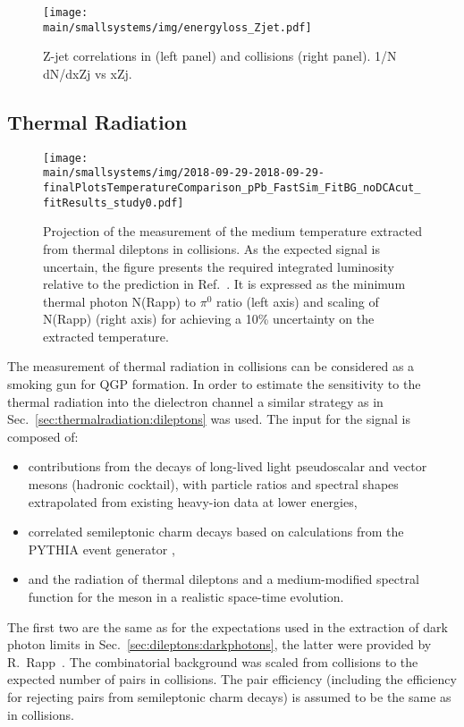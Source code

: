 \documentclass[../report.tex]{subfiles}
\providecommand{\main}{..}
\begin{document}
\begin{figure}[ht]
\centering
\texttt{[image: \\main/smallsystems/img/energyloss\_Zjet.pdf]}

\caption{Z-jet correlations in \pp (left panel) and \pPb collisions (right panel). 1/N dN/dxZj vs xZj.}
\label{fig:smallsystems_energyloss_Zjet}
\end{figure}

\subsection{Thermal Radiation}
\label{sect:smallsystems_thermalradiation}

\begin{figure}[ht]
\centering
\texttt{[image: \\main/smallsystems/img/2018-09-29-2018-09-29-finalPlotsTemperatureComparison\_pPb\_FastSim\_FitBG\_noDCAcut\_fitResults\_study0.pdf]}
\caption{Projection of the measurement of the medium temperature extracted from thermal dileptons in \pPb collisions. As the expected signal is uncertain, the figure presents the required integrated luminosity relative to the prediction in Ref.~\cite{}. It is expressed as the minimum thermal photon N(Rapp) to $\pi^0$ ratio (left axis) and scaling of N(Rapp) (right axis) for achieving a 10\% uncertainty on the extracted temperature.}
\label{fig:smallsystems_thermal_radition}
\end{figure}

The measurement of thermal radiation in \pPb collisions can be considered as a smoking gun for QGP formation. In order to estimate the sensitivity to the thermal radiation into the dielectron channel a similar strategy as in Sec.~\ref{sec:thermalradiation:dileptons} was used.
The input for the signal is composed of:
\begin{itemize}
\item contributions from the decays of long-lived light pseudoscalar and vector mesons (hadronic cocktail), with particle ratios and spectral shapes extrapolated from existing heavy-ion data at lower energies,
\item correlated semileptonic charm decays based on calculations from the PYTHIA event generator \cite{Sjostrand:2006za},
\item and the radiation of thermal dileptons and a medium-modified spectral function for the \Prho meson in a realistic space-time evolution.
\end{itemize}
The first two are the same as for the expectations used in the extraction of dark photon limits in Sec.~\ref{sec:dileptons:darkphotons}, the latter were provided by R.~Rapp~\cite{RappPriv1}. The combinatorial background was scaled from \PbPb collisions to the expected number of pairs in \pPb collisions. The pair efficiency (including the efficiency for rejecting \Pepem pairs from semileptonic charm decays) is assumed to be the same as in \PbPb collisions.
\end{document}
